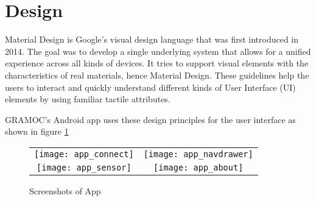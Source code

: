 \section{Design}

Material Design is Google's visual design language that was first introduced in 2014. The goal was to develop a single underlying system that allows for a unified experience across all kinds of devices. It tries to support visual elements with the characteristics of real materials, hence Material Design. These guidelines help the users to interact and quickly understand different kinds of User Interface (UI) elements by using familiar tactile attributes.

GRAMOC's Android app uses these design principles for the user interface as shown in figure \ref{fig:appscreenshots}

\begin{figure}[H]
	\centering
	\begin{tabular}{cc}
	\texttt{[image: app\_connect]}
	&
	\texttt{[image: app\_navdrawer]}
	\\
	\texttt{[image: app\_sensor]}
	&
	\texttt{[image: app\_about]}
	\end{tabular}
	\caption{Screenshots of App}
	\label{fig:appscreenshots}
\end{figure}
